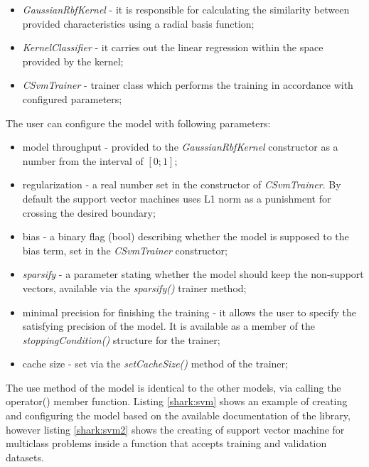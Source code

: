 \begin{itemize}
	\item \textit{GaussianRbfKernel} - it is responsible for calculating the similarity between provided characteristics using a radial basis function;
	\item \textit{KernelClassifier} - it carries out the linear regression within the space provided by the kernel;
	\item \textit{CSvmTrainer} - trainer class which performs the training in accordance with configured parameters;
\end{itemize}

The user can configure the model with following parameters:

\begin{itemize}
	\item model throughput - provided to the \textit{GaussianRbfKernel} constructor as a number from the interval of $[0; 1]$;
	\item regularization - a real number set in the constructor of \textit{CSvmTrainer}. By default the support vector machines uses L1 norm as a punishment for crossing the desired boundary;
	\item bias - a binary flag (bool) describing whether the model is supposed to the bias term, set in the \textit{CSvmTrainer} constructor;
	\item \textit{sparsify} - a parameter stating whether the model should keep the non-support vectors, available via the \textit{sparsify()} trainer method;
	\item minimal precision for finishing the training - it allows the user to specify the satisfying precision of the model. It is available as a member of the \textit{stoppingCondition()} structure for the trainer;
	\item cache size - set via the \textit{setCacheSize()} method of the trainer;
\end{itemize}

The use method of the model is identical to the other models, via calling the operator() member function. Listing \ref{shark:svm} shows an example of creating and configuring the model based on the available documentation of the library, however listing \ref{shark:svm2} shows the creating of support vector machine for multiclass problems inside a function that accepts training and validation datasets.


